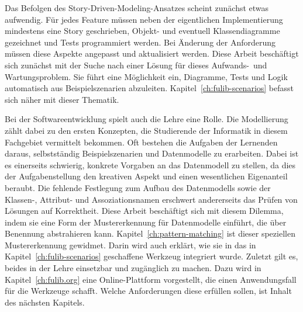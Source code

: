 Das Befolgen des Story-Driven-Modeling-Ansatzes scheint zunächst etwas aufwendig.
Für jedes Feature müssen neben der eigentlichen Implementierung mindestens eine Story geschrieben, Objekt- und eventuell Klassendiagramme gezeichnet und Tests programmiert werden.
Bei Änderung der Anforderung müssen diese Aspekte angepasst und aktualisiert werden.
Diese Arbeit beschäftigt sich zunächst mit der Suche nach einer Lösung für dieses Aufwands-\ und Wartungsproblem.
Sie führt eine Möglichkeit ein, Diagramme, Tests und Logik automatisch aus Beispielszenarien abzuleiten.
Kapitel~\ref{ch:fulib-scenarios} befasst sich näher mit dieser Thematik.

Bei der Softwareentwicklung spielt auch die Lehre eine Rolle.
Die Modellierung zählt dabei zu den ersten Konzepten, die Studierende der Informatik in diesem Fachgebiet vermittelt bekommen.
Oft bestehen die Aufgaben der Lernenden daraus, selbstständig Beispielszenarien und Datenmodelle zu erarbeiten.
Dabei ist es einerseits schwierig, konkrete Vorgaben an das Datenmodell zu stellen, da dies der Aufgabenstellung den kreativen Aspekt und einen wesentlichen Eigenanteil beraubt.
Die fehlende Festlegung zum Aufbau des Datenmodells sowie der Klassen-, Attribut- und Assoziationsnamen erschwert andererseits das Prüfen von Lösungen auf Korrektheit.
Diese Arbeit beschäftigt sich mit diesem Dilemma, indem sie eine Form der Mustererkennung für Datenmodelle einführt, die über Benennung abstrahieren kann.
Kapitel~\ref{ch:pattern-matching} ist dieser speziellen Mustererkennung gewidmet.
Darin wird auch erklärt, wie sie in das in Kapitel~\ref{ch:fulib-scenarios} geschaffene Werkzeug integriert wurde.
Zuletzt gilt es, beides in der Lehre einsetzbar und zugänglich zu machen.
Dazu wird in Kapitel~\ref{ch:fulib.org} eine Online-Plattform vorgestellt, die einen Anwendungsfall für die Werkzeuge schafft.
Welche Anforderungen diese erfüllen sollen, ist Inhalt des nächsten Kapitels.
